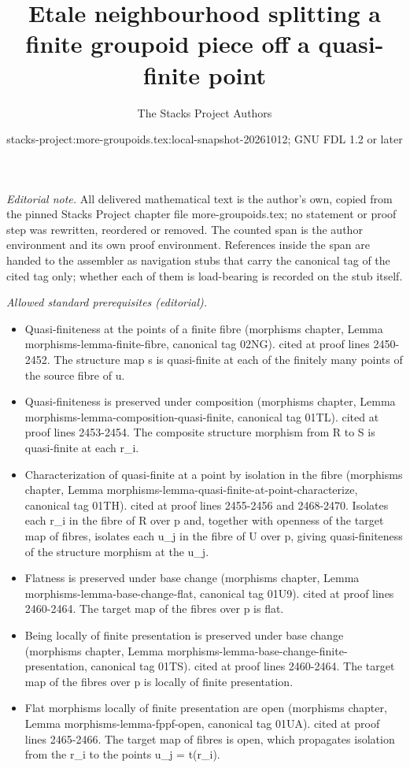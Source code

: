 \documentclass{stacks-project}
\title{Etale neighbourhood splitting a finite groupoid piece off a quasi-finite point}
\author{The Stacks Project Authors}
\date{stacks-project:more-groupoids.tex:local-snapshot-20261012; GNU FDL 1.2 or later}
\theoremstyle{plain}
\theoremstyle{definition}
\theoremstyle{remark}
\numberwithin{equation}{subsection}
\begin{document}
\maketitle
\setcounter{subsection}{1}
\noindent\textit{Editorial note.} All delivered mathematical text is the author's own, copied from the pinned Stacks Project chapter file more-groupoids.tex; no statement or proof step was rewritten, reordered or removed. The counted span is the author environment and its own proof environment. References inside the span are handed to the assembler as navigation stubs that carry the canonical tag of the cited tag only; whether each of them is load-bearing is recorded on the stub itself.\par\medskip
\noindent\textit{Allowed standard prerequisites (editorial).}\begin{itemize}
\item Quasi-finiteness at the points of a finite fibre (morphisms chapter, Lemma morphisms-lemma-finite-fibre, canonical tag 02NG). cited at proof lines 2450-2452. The structure map s is quasi-finite at each of the finitely many points of the source fibre of u.
\item Quasi-finiteness is preserved under composition (morphisms chapter, Lemma morphisms-lemma-composition-quasi-finite, canonical tag 01TL). cited at proof lines 2453-2454. The composite structure morphism from R to S is quasi-finite at each r\_i.
\item Characterization of quasi-finite at a point by isolation in the fibre (morphisms chapter, Lemma morphisms-lemma-quasi-finite-at-point-characterize, canonical tag 01TH). cited at proof lines 2455-2456 and 2468-2470. Isolates each r\_i in the fibre of R over p and, together with openness of the target map of fibres, isolates each u\_j in the fibre of U over p, giving quasi-finiteness of the structure morphism at the u\_j.
\item Flatness is preserved under base change (morphisms chapter, Lemma morphisms-lemma-base-change-flat, canonical tag 01U9). cited at proof lines 2460-2464. The target map of the fibres over p is flat.
\item Being locally of finite presentation is preserved under base change (morphisms chapter, Lemma morphisms-lemma-base-change-finite-presentation, canonical tag 01TS). cited at proof lines 2460-2464. The target map of the fibres over p is locally of finite presentation.
\item Flat morphisms locally of finite presentation are open (morphisms chapter, Lemma morphisms-lemma-fppf-open, canonical tag 01UA). cited at proof lines 2465-2466. The target map of fibres is open, which propagates isolation from the r\_i to the points u\_j = t(r\_i).

\end{itemize}
\end{document}
